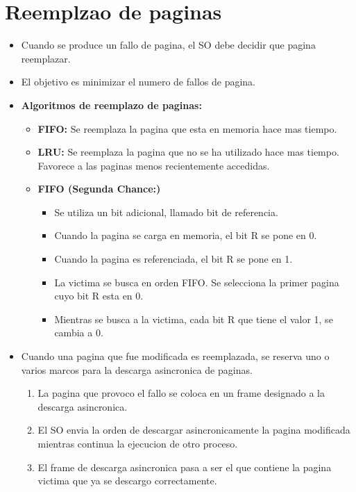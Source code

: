 \documentclass[12pt]{article}
\begin{document}
\section{Reemplzao de paginas}
\begin{itemize}
    \item Cuando se produce un fallo de pagina, el SO debe decidir que pagina reemplazar.
    \item El objetivo es minimizar el numero de fallos de pagina.
    \item \textbf{Algoritmos de reemplazo de paginas:}
        \begin{itemize}
            \item \textbf{FIFO:} Se reemplaza la pagina que esta en memoria hace mas tiempo.
            \item \textbf{LRU:} Se reemplaza la pagina que no se ha utilizado hace mas tiempo. Favorece a las paginas menos recientemente accedidas.
            \item \textbf{FIFO (Segunda Chance:)} 
                \begin{itemize}
                    \item Se utiliza un bit adicional, llamado bit de referencia.
                    \item Cuando la pagina se carga en memoria, el bit R se pone en 0.
                    \item Cuando la pagina es referenciada, el bit R se pone en 1.
                    \item La victima se busca en orden FIFO. Se selecciona la primer pagina cuyo bit R esta en 0.
                    \item Mientras se busca a la victima, cada bit R que tiene el valor 1, se cambia a 0.
                \end{itemize}
        \end{itemize}
        \item Cuando una pagina que fue modificada es reemplazada, se reserva uno o varios marcos para la descarga asincronica de paginas.
            \begin{enumerate}
                \item La pagina que provoco el fallo se coloca en un frame designado a la descarga asincronica.
                \item El SO envia la orden de descargar asincronicamente la pagina modificada mientras continua la ejecucion de otro proceso.
                \item El frame de descarga asincronica pasa a ser el que contiene la pagina victima que ya se descargo correctamente.
            \end{enumerate}
\end{itemize}
\end{document}
